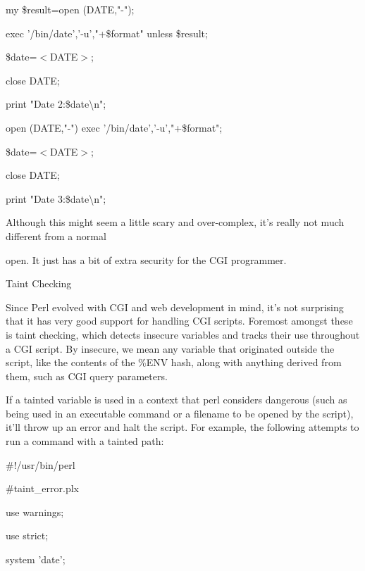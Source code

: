 \documentclass[a4paper,11pt]{book}
\begin{document}
\noindent my \$result=open (DATE,"-\textbar ");

\noindent exec '/bin/date','-u',"+\$format" unless \$result;

\noindent \$date=$<$DATE$>$;

\noindent close DATE;

\noindent print "Date 2:\$date\textbackslash n";

\noindent 

\noindent open (DATE,"-\textbar ") \textbar \textbar  exec '/bin/date','-u',"+\$format";

\noindent \$date=$<$DATE$>$;

\noindent close DATE;

\noindent print "Date 3:\$date\textbackslash n";

\noindent 

\noindent Although this might seem a little scary and over-complex, it's really not much different from a normal

\noindent open. It just has a bit of extra security for the CGI programmer.

\noindent 

\noindent Taint Checking

\noindent 

\noindent Since Perl evolved with CGI and web development in mind, it's not surprising that it has very good support for handling CGI scripts. Foremost amongst these is taint checking, which detects insecure variables and tracks their use throughout a CGI script. By insecure, we mean any variable that originated outside the script, like the contents of the \%ENV hash, along with anything derived from them, such as CGI query parameters.

\noindent 

\noindent If a tainted variable is used in a context that perl considers dangerous (such as being used in an executable command or a filename to be opened by the script), it'll throw up an error and halt the script. For example, the following attempts to run a command with a tainted path:

\noindent 

\noindent 

\noindent \#!/usr/bin/perl

\noindent \#taint\_error.plx

\noindent use warnings;

\noindent use strict;

\noindent 

\noindent system 'date';
\end{document}
